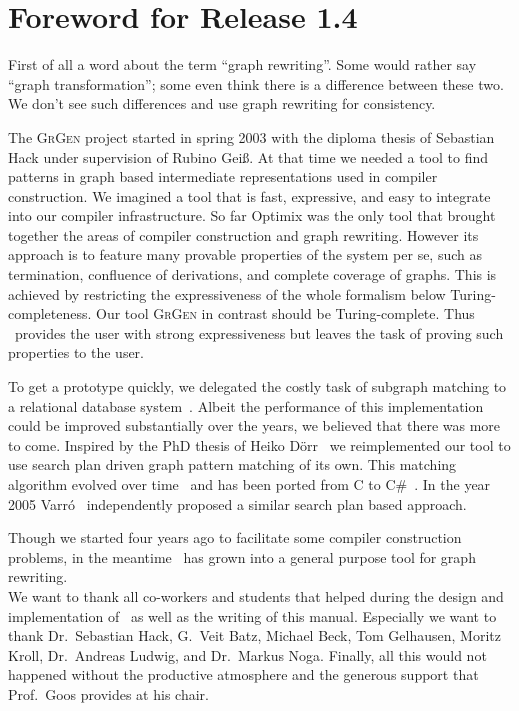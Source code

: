 \chapter*{Foreword for Release 1.4}
First of all a word about the term ``graph rewriting''.
Some would rather say ``graph transformation''; some even think there is a difference between these two.
We don't see such differences and use graph rewriting for consistency.

The \textsc{GrGen} project started in spring 2003 with the diploma thesis of Sebastian Hack under supervision of Rubino Gei\ss.
At that time we needed a tool to find patterns in graph based intermediate representations used in compiler construction.
We imagined a tool that is fast, expressive, and easy to integrate into our compiler infrastructure.
So far Optimix\cite{assmann00graph} was the only tool that brought together the areas of compiler construction and graph rewriting.
However its approach is to feature many provable properties of the system per se, such as termination, confluence of derivations, and complete coverage of graphs.
This is achieved by restricting the expressiveness of the whole formalism below Turing-completeness.
Our tool \textsc{GrGen} in contrast should be Turing-complete.
Thus \GrG\ provides the user with strong expressiveness but leaves the task of proving such properties to the user.

To get a prototype quickly, we delegated the costly task of subgraph matching to a relational database system~\cite{Hac:03}.
Albeit the performance of this implementation could be improved substantially over the years, we believed that there was more to come.
Inspired by the PhD thesis of Heiko D\"orr~\cite{doerr} we reimplemented our tool to use search plan driven graph pattern matching of its own.
This matching algorithm evolved over time~\cite{adam,Bat:05:SA,Bat:05:DA,Bat:06,BKG:07} and has been ported from C to C\#~\cite{KG:07,Kro:07}. 
In the year 2005 Varr\'o~\cite{gramot2005_adapt} independently proposed a similar search plan based approach.

Though we started four years ago to facilitate some compiler construction problems, in the meantime \GrG\ has grown into a general purpose tool for graph rewriting.\\[3ex]

We want to thank all co-workers and students that helped during the design and implementation of \GrG\ as well as the writing of this manual.
Especially we want to thank Dr.~Sebastian Hack, G.~Veit Batz, Michael Beck, Tom Gelhausen, Moritz Kroll, Dr.~Andreas Ludwig, and Dr.~Markus Noga.
Finally, all this would not happened without the productive atmosphere and the generous support that Prof.~Goos provides at his chair.\\[3ex]

